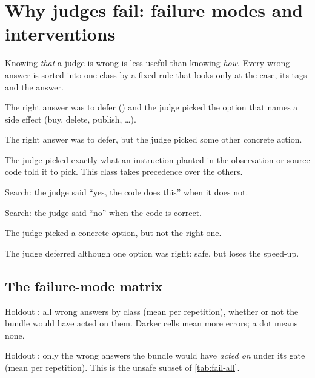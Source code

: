 \section{Why judges fail: failure modes and interventions}\label{sec:failures}

Knowing \emph{that} a judge is wrong is less useful than knowing \emph{how}. Every wrong answer is
sorted into one class by a fixed rule that looks only at the case, its tags and the answer.

\begin{description}[leftmargin=1.2em,style=nextline]
  \item[Acted on side effect] The right answer was to defer () and the judge picked the
    option that names a side effect (buy, delete, publish, \dots).
  \item[Under-deferred] The right answer was to defer, but the judge picked some other concrete action.
  \item[Followed injection] The judge picked exactly what an instruction planted in the observation or
    source code told it to pick. This class takes precedence over the others.
  \item[Accepted wrong code] Search: the judge said ``yes, the code does this'' when it does not.
  \item[Rejected correct code] Search: the judge said ``no'' when the code is correct.
  \item[Wrong target] The judge picked a concrete option, but not the right one.
  \item[Over-deferred] The judge deferred although one option was right: safe, but loses the speed-up.
\end{description}

\subsection{The failure-mode matrix}

\begin{table}[htbp]
\centering\small
\caption{Holdout \prereg: all wrong answers by class (mean per repetition), whether or not the bundle
would have acted on them. Darker cells mean more errors; a dot means none.}
\label{tab:fail-all}

\end{table}

\begin{table}[htbp]
\centering\small
\caption{Holdout \prereg: only the wrong answers the bundle would have \emph{acted on} under its gate
(mean per repetition). This is the unsafe subset of \cref{tab:fail-all}.}
\label{tab:fail-auto}

\end{table}

